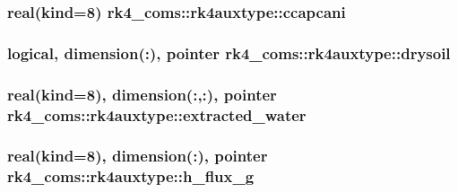 \subsubsection[{ccapcani}]{\setlength{\rightskip}{0pt plus 5cm}real(kind=8) rk4\+\_\+coms\+::rk4auxtype\+::ccapcani}\label{structrk4__coms_1_1rk4auxtype_a9ae387bbc1d6b912953285b3b554faf4}
\hypertarget{structrk4__coms_1_1rk4auxtype_ad5d4af75e8d2d89db474d1a0e3778559}{}
\subsubsection[{drysoil}]{\setlength{\rightskip}{0pt plus 5cm}logical, dimension(\+:), pointer rk4\+\_\+coms\+::rk4auxtype\+::drysoil}\label{structrk4__coms_1_1rk4auxtype_ad5d4af75e8d2d89db474d1a0e3778559}
\hypertarget{structrk4__coms_1_1rk4auxtype_a40b225abc98b342f89d9091e8e4a795e}{}
\subsubsection[{extracted\+\_\+water}]{\setlength{\rightskip}{0pt plus 5cm}real(kind=8), dimension(\+:,\+:), pointer rk4\+\_\+coms\+::rk4auxtype\+::extracted\+\_\+water}\label{structrk4__coms_1_1rk4auxtype_a40b225abc98b342f89d9091e8e4a795e}
\hypertarget{structrk4__coms_1_1rk4auxtype_a3a5b9aae7dcb9a177b367a8cb68a600f}{}
\subsubsection[{h\+\_\+flux\+\_\+g}]{\setlength{\rightskip}{0pt plus 5cm}real(kind=8), dimension(\+:), pointer rk4\+\_\+coms\+::rk4auxtype\+::h\+\_\+flux\+\_\+g}\label{structrk4__coms_1_1rk4auxtype_a3a5b9aae7dcb9a177b367a8cb68a600f}
\hypertarget{structrk4__coms_1_1rk4auxtype_ab8c8840096f6fc896f29746ef17e3497}{}
